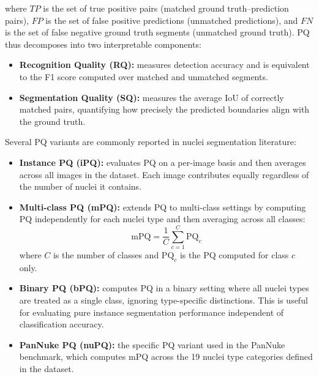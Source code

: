 where $TP$ is the set of true positive pairs (matched ground truth--prediction pairs), $FP$ is the set of false positive predictions (unmatched predictions), and $FN$ is the set of false negative ground truth segments (unmatched ground truth). PQ thus decomposes into two interpretable components:

\begin{itemize}
	\item \textbf{Recognition Quality (RQ):} measures detection accuracy and is equivalent to the F1 score computed over matched and unmatched segments.
	\item \textbf{Segmentation Quality (SQ):} measures the average IoU of correctly matched pairs, quantifying how precisely the predicted boundaries align with the ground truth.
\end{itemize}

Several PQ variants are commonly reported in nuclei segmentation literature:

\begin{itemize}
	\item \textbf{Instance PQ (iPQ):} evaluates PQ on a per-image basis and then averages across all images in the dataset. Each image contributes equally regardless of the number of nuclei it contains.
	\item \textbf{Multi-class PQ (mPQ):} extends PQ to multi-class settings by computing PQ independently for each nuclei type and then averaging across all classes:
	\begin{equation}
		\text{mPQ} = \frac{1}{C} \sum_{c=1}^{C} \text{PQ}_c
	\end{equation}
	where $C$ is the number of classes and $\text{PQ}_c$ is the PQ computed for class $c$ only.
	\item \textbf{Binary PQ (bPQ):} computes PQ in a binary setting where all nuclei types are treated as a single class, ignoring type-specific distinctions. This is useful for evaluating pure instance segmentation performance independent of classification accuracy.
	\item \textbf{PanNuke PQ (nuPQ):} the specific PQ variant used in the PanNuke benchmark, which computes mPQ across the 19 nuclei type categories defined in the dataset.
\end{itemize}

